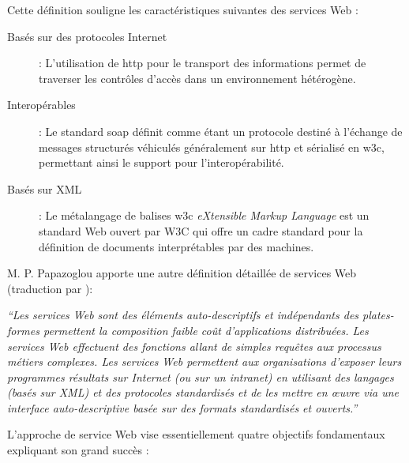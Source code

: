   Cette définition souligne les caractéristiques suivantes des services
  Web \cite{fremantle2002enterprise}:

  \renewcommand{\descriptionlabel}[1]{\hspace{0.5cm}\textbullet~\textsf{#1}}
  \begin{description}
  \item[Basés sur des protocoles Internet]: L'utilisation de
    \acrshort{http} pour le transport des informations permet de
    traverser les contrôles d'accès dans un environnement hétérogène.

  \item[Interopérables]: Le standard \acrshort{soap}
    \cite{box2000simple} définit comme étant un protocole destiné à
    l'échange de messages structurés véhiculés généralement sur
    \acrshort{http} et sérialisé en \acrshort{w3c}, permettant ainsi le
    support pour l'interopérabilité.

  \item[Basés sur XML] : Le métalangage de balises \acrshort{w3c}
    \textit{eXtensible Markup Language} est un standard Web ouvert par
    \textsc{W3C} \cite{bray1998extensible} qui offre un cadre standard
    pour la définition de documents interprétables par des machines.
  \end{description}
  \enddescription

  M. P. Papazoglou \cite{papazoglou2003service} apporte une autre
  définition détaillée de services Web (traduction par
  \cite{driss2011approche}):\bigskip

  \textit{``Les services Web sont des éléments auto-descriptifs et
    indépendants des plates-formes permettent la composition faible coût
    d’applications distribuées. Les services Web effectuent des
    fonctions allant de simples requêtes aux processus métiers
    complexes. Les services Web permettent aux organisations d'exposer
    leurs programmes résultats sur Internet (ou sur un intranet) en
    utilisant des langages (basés sur XML) et des protocoles
    standardisés et de les mettre en œuvre via une interface
    auto-descriptive basée sur des formats standardisés et
    ouverts.''}\bigskip

  L'approche de service Web vise essentiellement quatre objectifs
  fondamentaux expliquant son grand succès \cite{driss2011approche}:

